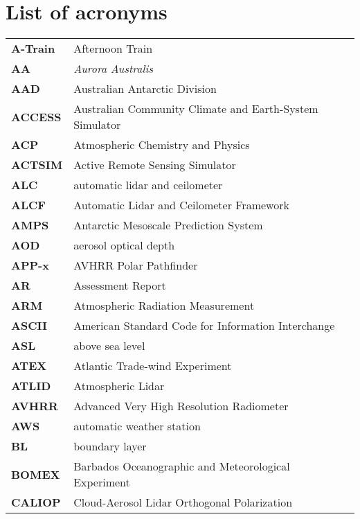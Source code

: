 \chapter*{List of acronyms}

\label{chap:acronyms}

\vspace{-24pt}
\footnotesize
\sffamily

\begin{longtable}{@{}p{2cm}p{20cm}}
\label{tab:acronyms}\\
\textbf{A-Train} & Afternoon Train\\
\textbf{AA} & \textit{Aurora Australis}\\
\textbf{AAD} & Australian Antarctic Division\\
\textbf{ACCESS} & Australian Community Climate and Earth-System Simulator\\
\textbf{ACP} & Atmospheric Chemistry and Physics\\
\textbf{ACTSIM} & Active Remote Sensing Simulator\\
\textbf{ALC} & automatic lidar and ceilometer\\
\textbf{ALCF} & Automatic Lidar and Ceilometer Framework\\
\textbf{AMPS} & Antarctic Mesoscale Prediction System\\
\textbf{AOD} & aerosol optical depth\\
\textbf{APP-x} & AVHRR Polar Pathfinder\\
\textbf{AR} & Assessment Report\\
\textbf{ARM} & Atmospheric Radiation Measurement\\
\textbf{ASCII} & American Standard Code for Information Interchange\\
\textbf{ASL} & above sea level\\
\textbf{ATEX} & Atlantic Trade-wind Experiment\\
\textbf{ATLID} & Atmospheric Lidar\\
\textbf{AVHRR} & Advanced Very High Resolution Radiometer\\
\textbf{AWS} & automatic weather station\\
\textbf{BL} & boundary layer\\
\textbf{BOMEX} & Barbados Oceanographic and Meteorological Experiment\\
\textbf{CALIOP} & Cloud-Aerosol Lidar Orthogonal Polarization\\

\end{longtable}
